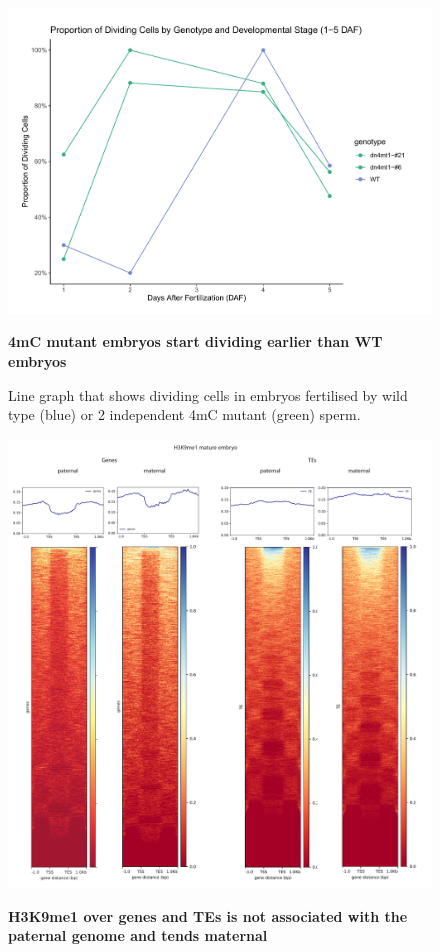 \begin{figure}[htbp!] 
\centering    
    \includegraphics[width=1\textwidth]{Chapter3/Figs/Supps/FigureS4_dividing_cells.pdf}
\caption{\textbf{4mC mutant embryos start dividing earlier than WT embryos}}
\label{fig:Dividing_cells}
\captionsetup{font=small}
    \caption*{Line graph that shows dividing cells in embryos fertilised by wild type (blue) or 2 independent 4mC mutant (green) sperm.}
\end{figure}

\begin{figure}[htbp!] 
\centering    
    \includegraphics[width=1\textwidth]{Chapter3/Figs/Supps/FigureS5_H3k9me1.pdf}
\caption{\textbf{H3K9me1 over genes and TEs is not associated with the paternal genome and tends maternal}}
\label{fig:h3k8me1}
\captionsetup{font=small}
    \caption*{}
\end{figure}

